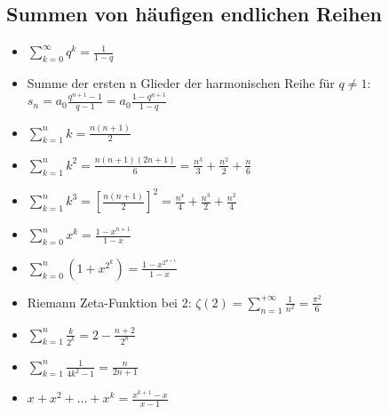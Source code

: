 \documentclass[a3paper, 11pt, landscape]{scrartcl}
\begin{document}
\begin{multicols*}{3}
		\subsection{Summen von häufigen endlichen Reihen}
		\begin{itemize}
			\item $\sum\limits_{k=0}^{\infty} q^k = \frac{1}{1-q}$
			\item Summe der ersten n Glieder der harmonischen Reihe für $q\neq 1$: $s_n = a_0\frac{q^{n+1}-1}{q-1} = a_0\frac{1-q^{n+1}}{1-q}$
			\item $\sum_{k=1}^n k=\frac{n(n+1)}{2}$
			\item $\sum_{k=1}^n k^2=\frac{n(n+1)(2n+1)}{6}=\frac{n^3}{3}+\frac{n^2}{2}+\frac{n}{6}$
			\item $\sum_{k=1}^n k^3=\left[\frac{n(n+1)}{2}\right]^2=\frac{n^4}{4}+\frac{n^3}{2}+\frac{n^2}{4}$
			\item $\sum_{k=0}^{n} x^k = \frac{1-x^{n+1}}{1-x}$
			\item $\sum_{k=0}^n (1+x^{2^k})=\frac{1-x^{2^{n+1}}}{1-x}$
			\item Riemann Zeta-Funktion bei 2: $\zeta(2)=\sum_{n=1}^{+\infty} \frac{1}{n^{2}}=\frac{\pi^{2}}{6}$
			\item $\sum_{k=1}^n \frac{k}{2^k}=2-\frac{n+2}{2^n}$
			\item $\sum_{k=1}^n \frac{1}{4k^2-1}=\frac{n}{2n+1}$
			\item $x+x^{2}+\ldots+x^{k}=\frac{x^{k+1}-x}{x-1}$
		\end{itemize}

\end{multicols*}
\end{document}
